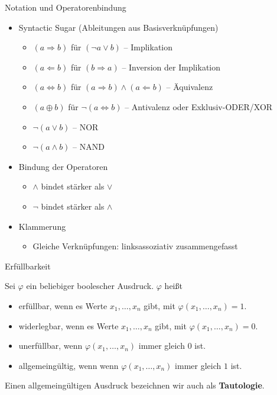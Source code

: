 \documentclass[12pt%
,aspectratio=169%
]{beamer}
\begin{document}
\begin{frame}{Notation und Operatorenbindung}
\begin{itemize}
	\item Syntactic Sugar (Ableitungen aus Basisverknüpfungen)
	\begin{itemize}
		\item $(a \Rightarrow b)$ für $(\neg a \lor b)$ -- Implikation
		\item $(a \Leftarrow b)$ für $(b \Rightarrow a)$ -- Inversion der Implikation
		\item $(a \Leftrightarrow b)$ für $(a \Rightarrow b) \land (a \Leftarrow b)$ -- Äquivalenz
		\item $(a \oplus b)$ für $\neg (a \Leftrightarrow b)$ -- Antivalenz oder Exklusiv-ODER/XOR
		\item $\neg(a \lor b)$ -- NOR
		\item $\neg (a \land b)$ -- NAND
	\end{itemize}
	\item Bindung der Operatoren 
	\begin{itemize}
		\item $\land$ bindet stärker als $\lor$
		\item $\neg$ bindet stärker als $\land$
	\end{itemize}
	\item Klammerung
	\begin{itemize}
		\item Gleiche Verknüpfungen: linksassoziativ zusammengefasst
	\end{itemize}
\end{itemize}	 
\end{frame}

\begin{frame}{Erfüllbarkeit}
	\begin{definition}[Erfüllbarkeit]
		Sei $\varphi$ ein beliebiger boolescher Ausdruck. $\varphi$ heißt
		\begin{itemize}
			\item erfüllbar, wenn es Werte $x_1, \ldots, x_n$ gibt, mit $\varphi (x_1, \ldots, x_n ) = 1$.
			\item widerlegbar, wenn es Werte $x_1, \ldots, x_n$ gibt, mit $\varphi (x_1, \ldots, x_n) = 0$.
			\item unerfüllbar, wenn $\varphi (x_1 ,\ldots , x_n )$ immer gleich $0$ ist.
			\item allgemeingültig, wenn wenn $\varphi (x_1 ,\ldots , x_n )$ immer gleich $1$ ist.
		\end{itemize}
		Einen allgemeingültigen Ausdruck bezeichnen wir auch als \textbf{Tautologie}.
	\end{definition}
\end{frame}
\end{document}
